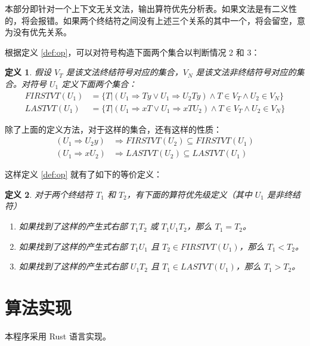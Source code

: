 \documentclass[UTF8]{ctexart}
\newtheorem{definition}{定义}
\begin{document}
本部分即针对一个上下文无关文法，输出算符优先分析表。如果文法是有二义性的，将会报错。如果两个终结符之间没有上述三个关系的其中一个，将会留空，意为没有优先关系。

根据定义 \ref{def:op}，可以对符号构造下面两个集合以判断情况 2 和 3：

\begin{definition}\label{def:vt}
    假设 $V_T$ 是该文法终结符号对应的集合，$V_N$ 是该文法非终结符号对应的集合。对符号 $U_1$ 定义下面两个集合：
    \begin{align}
        \textit{FIRSTVT}(U_1) &= \{T|(U_1\Rightarrow Ty \vee U_1\Rightarrow U_2Ty)\land T\in V_T\land U_2\in V_N\}  \\
        \textit{LASTVT}(U_1) &= \{T|(U_1\Rightarrow xT \vee U_1\Rightarrow xTU_2)\land T\in V_T\land U_2\in V_N\}
    \end{align}
\end{definition}

除了上面的定义方法，对于这样的集合，还有这样的性质：
\begin{align}
    (U_1\Rightarrow U_2y) &\Rightarrow \textit{FIRSTVT}(U_2)\subseteq \textit{FIRSTVT}(U_1) \\
    (U_1\Rightarrow xU_2) &\Rightarrow \textit{LASTVT}(U_2)\subseteq \textit{LASTVT}(U_1)
\end{align}

这样定义 \ref{def:op} 就有了如下的等价定义：
\begin{definition}\label{def:opn}
    对于两个终结符 $T_1$ 和 $T_2$，有下面的算符优先级定义（其中 $U_1$ 是非终结符）
    \begin{enumerate}
        \item 如果找到了这样的产生式右部 $T_1T_2$ 或 $T_1U_1T_2$，那么 $T_1=T_2$。
        \item 如果找到了这样的产生式右部 $T_1U_1$ 且 $T_2\in\textit{FIRSTVT}(U_1)$，那么 $T_1<T_2$。
        \item 如果找到了这样的产生式右部 $U_1T_2$ 且 $T_1\in\textit{LASTVT}(U_1)$，那么 $T_1>T_2$。
    \end{enumerate}
\end{definition}

\section{算法实现}

本程序采用 Rust 语言实现\cite{SteveKlabnik2019}。

\end{document}

